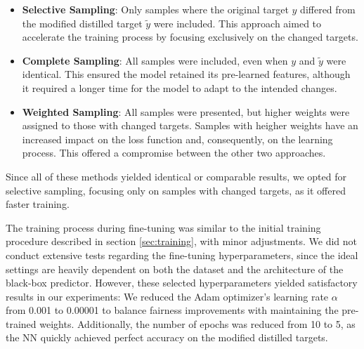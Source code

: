 \begin{itemize}  
    \item \textbf{Selective Sampling}:  
    Only samples where the original target $y$ differed from the modified distilled target $\tilde{y}$ were included.  
    This approach aimed to accelerate the training process by focusing exclusively on the changed targets.  

    \item \textbf{Complete Sampling}:  
    All samples were included, even when $y$ and $\tilde{y}$ were identical.  
    This ensured the model retained its pre-learned features, although it required a longer time  
    for the model to adapt to the intended changes.  

    \item \textbf{Weighted Sampling}:  
    All samples were presented, but higher weights were assigned to those with changed targets.  
    Samples with heigher weights have an increased impact on the loss function and,
    consequently, on the learning process.
    This offered a compromise between the other two approaches.
\end{itemize}  

Since all of these methods yielded identical or comparable results, we opted for selective sampling,  
focusing only on samples with changed targets, as it offered faster training.  

The training process during fine-tuning was similar to the initial training procedure
described in section \ref{sec:training}, with minor adjustments.
We did not conduct extensive tests regarding the fine-tuning hyperparameters,
since the ideal settings are heavily dependent on both the 
dataset and the architecture of the black-box predictor.
However, these selected hyperparameters yielded satisfactory results in our experiments:
We reduced the Adam optimizer's learning rate $\alpha$ from 0.001
to 0.00001 to balance fairness improvements with maintaining the pre-trained weights.
Additionally, the number of epochs was reduced from 10 to 5,
as the NN quickly achieved perfect accuracy on the modified distilled targets.


